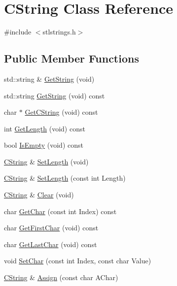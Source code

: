\hypertarget{classCString}{\section{C\-String Class Reference}
\label{classCString}
}


{\ttfamily \#include $<$stlstrings.\-h$>$}

\subsection*{Public Member Functions}
\begin{DoxyCompactItemize}
\item 
std\-::string \& \hyperlink{classCString_aec88dea409ae70595abbcb2e79176c51}{Get\-String} (void)
\item 
std\-::string \hyperlink{classCString_af8849a27525b027c8ca8b9dbf2851008}{Get\-String} (void) const 
\item 
char $\ast$ \hyperlink{classCString_a89f4fb9625faa8da2968fe7e4c536336}{Get\-C\-String} (void) const 
\item 
int \hyperlink{classCString_ab164e71d36fcad14e1d9102bbcd43436}{Get\-Length} (void) const 
\item 
bool \hyperlink{classCString_aa205404d30ddbfcc78eb4de2f6776727}{Is\-Empty} (void) const 
\item 
\hyperlink{classCString}{C\-String} \& \hyperlink{classCString_a143b9ed2eb33130b4667ac18ff2ff147}{Set\-Length} (void)
\item 
\hyperlink{classCString}{C\-String} \& \hyperlink{classCString_acc8ac9f4fd7c25d7bbeb43f5286923f6}{Set\-Length} (const int Length)
\item 
\hyperlink{classCString}{C\-String} \& \hyperlink{classCString_a1af439dc7f12a2efb1d88ee7b955d7ec}{Clear} (void)
\item 
char \hyperlink{classCString_ab9c31553d1e7a7a4fb02022503ef37bb}{Get\-Char} (const int Index) const 
\item 
char \hyperlink{classCString_af49ae4563654e241cda2dc87ae50d9a2}{Get\-First\-Char} (void) const 
\item 
char \hyperlink{classCString_a1454fd58ca4e65ac4cb5df71ef299e0b}{Get\-Last\-Char} (void) const 
\item 
void \hyperlink{classCString_a3a00221ad9e9d2df3779679094b6af70}{Set\-Char} (const int Index, const char Value)
\item 
\hyperlink{classCString}{C\-String} \& \hyperlink{classCString_a134c49fc1f46a045398206e6f17c2a7d}{Assign} (const char A\-Char)

\end{DoxyCompactItemize}
